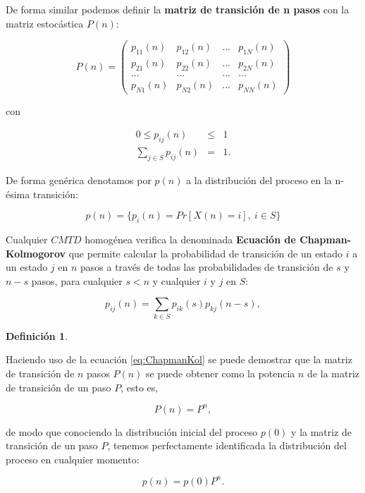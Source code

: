\documentclass[
]{book}
\newenvironment{yellowbox}{
  \definecolor{shadecolor}{rgb}{210, 180, 140}  
  \color{black}
  \begin{shaded}}
 {\end{shaded}}
\theoremstyle{definition}
\newtheorem{definition}{Definición}[chapter]
\theoremstyle{definition}
\theoremstyle{definition}
\theoremstyle{definition}
\theoremstyle{remark}
\begin{document}
De forma similar podemos definir la \textbf{matriz de transición de n pasos} con la matriz estocástica \(P(n)\):

\[P(n) = 
\begin{pmatrix}
p_{11}(n) & p_{12}(n) & ... & p_{1N}(n)\\
p_{21}(n) & p_{22}(n) & ... & p_{2N}(n)\\
... & ... & ... & ...\\
p_{N1}(n) & p_{N2}(n) & ... & p_{NN}(n)
\end{pmatrix}\]

con

\begin{eqnarray*}
0 \leq p_{ij}(n) &\leq& 1 \\
\sum_{j \in S} p_{ij}(n) &=& 1.
\end{eqnarray*}

De forma genérica denotamos por \(p(n)\) a la distribución del proceso en la n-ésima transición:

\[p(n) = \{p_i(n)=Pr[X(n)=i], \ i \in S\}\]

Cualquier \(CMTD\) homogénea verifica la denominada \textbf{Ecuación de Chapman-Kolmogorov} que permite calcular la probabilidad de transición de un estado \(i\) a un estado \(j\) en \(n\) pasos a través de todas las probabilidades de transición de \(s\) y \(n-s\) pasos, para cualquier \(s<n\) y cualquier \(i\) y \(j\) en \(S\):

\begin{equation}
p_{ij}(n) = \sum_{k \in S} p_{ik}(s) p_{kj}(n-s),
\label{eq:ChapmanKol}
\end{equation}

\begin{yellowbox}

\begin{definition}
\protect\hypertarget{def:p-npasos}{}\label{def:p-npasos}

Haciendo uso de la ecuación \eqref{eq:ChapmanKol} se puede demostrar que la matriz de transición de \(n\) pasos \(P(n)\) se puede obtener como la potencia \(n\) de la matriz de transición de un paso \(P\), esto es,

\begin{equation}
P(n) = P^n,
\label{eq:matriznpasos}
\end{equation}

de modo que conociendo la distribución inicial del proceso \(p(0)\) y la matriz de transición de un paso \(P\), tenemos perfectamente identificada la distribución del proceso en cualquier momento:

\begin{equation}
p(n) = p(0)P^n.
\label{eq:distriproceso}
\end{equation}

\end{definition}

\end{yellowbox}
\end{document}
